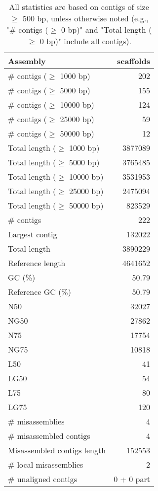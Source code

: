 \documentclass[12pt,a4paper]{article}
\begin{document}
\begin{table}[ht]
\begin{center}
\caption{All statistics are based on contigs of size $\geq$ 500 bp, unless otherwise noted (e.g., "\# contigs ($\geq$ 0 bp)" and "Total length ($\geq$ 0 bp)" include all contigs).}
\begin{tabular}{|l*{1}{|r}|}
\hline
Assembly & scaffolds \\ \hline
\# contigs ($\geq$ 1000 bp) & 202 \\ \hline
\# contigs ($\geq$ 5000 bp) & 155 \\ \hline
\# contigs ($\geq$ 10000 bp) & 124 \\ \hline
\# contigs ($\geq$ 25000 bp) & 59 \\ \hline
\# contigs ($\geq$ 50000 bp) & 12 \\ \hline
Total length ($\geq$ 1000 bp) & 3877089 \\ \hline
Total length ($\geq$ 5000 bp) & 3765485 \\ \hline
Total length ($\geq$ 10000 bp) & 3531953 \\ \hline
Total length ($\geq$ 25000 bp) & 2475094 \\ \hline
Total length ($\geq$ 50000 bp) & 823529 \\ \hline
\# contigs & 222 \\ \hline
Largest contig & 132022 \\ \hline
Total length & 3890229 \\ \hline
Reference length & 4641652 \\ \hline
GC (\%) & 50.79 \\ \hline
Reference GC (\%) & 50.79 \\ \hline
N50 & 32027 \\ \hline
NG50 & 27862 \\ \hline
N75 & 17754 \\ \hline
NG75 & 10818 \\ \hline
L50 & 41 \\ \hline
LG50 & 54 \\ \hline
L75 & 80 \\ \hline
LG75 & 120 \\ \hline
\# misassemblies & 4 \\ \hline
\# misassembled contigs & 4 \\ \hline
Misassembled contigs length & 152553 \\ \hline
\# local misassemblies & 2 \\ \hline
\# unaligned contigs & 0 + 0 part \\ \hline

\end{tabular}
\end{center}
\end{table}
\end{document}
